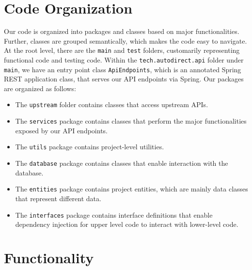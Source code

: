 \documentclass[fontsize=14pt]{article}
\begin{document}
\section*{Code Organization}

Our code is organized into packages and classes based on major functionalities. Further, classes are grouped semantically, which makes the code easy to navigate. At the root level, there are the \texttt{main} and \texttt{test} folders, customarily representing functional code and testing code. Within the \texttt{tech.autodirect.api} folder under \texttt{main}, we have an entry point class \texttt{ApiEndpoints}, which is an annotated Spring REST application class, that serves our API endpoints via Spring. Our packages are organized as follows:
\begin{itemize}
    \item The \texttt{upstream} folder contains classes that access upstream APIs.
    
    \item The \texttt{services} package contains classes that perform the major functionalities exposed by our API endpoints.
    
    \item The \texttt{utils} package contains project-level utilities.
    
    \item The \texttt{database} package contains classes that enable interaction with the database.
    
    \item The \texttt{entities} package contains project entities, which are mainly data classes that represent different data.
    
    \item The \texttt{interfaces} package contains interface definitions that enable dependency injection for upper level code to interact with lower-level code.
\end{itemize}

\section*{Functionality}
\end{document}
